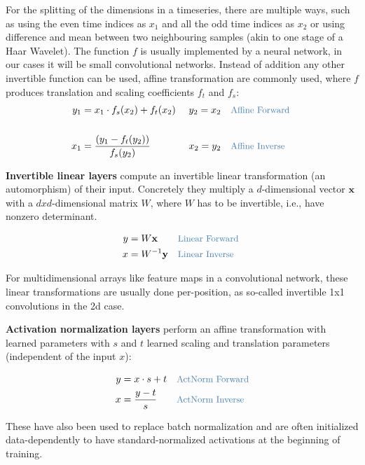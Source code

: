 % 

For the splitting of the dimensions in a timeseries, there are multiple
ways, such as using the even time indices as $x_1$ and all the odd
time indices as $x_2$ or using difference and mean between two
neighbouring samples (akin to one stage of a Haar Wavelet). The function
$f$ is usually implemented by a neural network, in our cases it will
be small convolutional networks. Instead of addition any other
invertible function can be used, affine transformation are commonly
used, where $f$ produces translation and scaling coefficients $f_t$
and $f_s$:
\begin{align*}
    y_1 &= x_1 \cdot f_s(x_2) + f_t(x_2) && \text{ } y_2=x_2 && \codecomment{\text{Affine Forward }} \\
    \\
    x_1 &= \frac{(y_1  - f_t(y_2))}{f_s(y_2)} && \text{ } x_2=y_2 && \codecomment{\text{Affine Inverse}} \\
\end{align*}

\textbf{Invertible linear layers} compute an invertible linear
transformation (an automorphism) of their input. Concretely they
multiply a $d$-dimensional vector $\mathbf{x}$ with a
$dxd$-dimensional matrix $W$, where $W$ has to be invertible,
i.e., have nonzero determinant.

\begin{align*}
    y&=W \mathbf{x} && \codecomment{\text{Linear Forward }} \\
    x&=W^{-1} \mathbf{y} && \codecomment{\text{Linear Inverse}} \\
\end{align*}

For multidimensional arrays like feature maps in a convolutional
network, these linear transformations are usually done per-position, as
so-called invertible 1x1 convolutions in the 2d case.


\textbf{Activation normalization layers} perform an affine
transformation with learned parameters with $s$ and $t$ learned
scaling and translation parameters (independent of the input $x$):

\begin{align*}
    y&=x \cdot{s} + t && \codecomment{\text{ActNorm Forward}} \\
    x&=\frac{y - t}{s} && \codecomment{\text{ActNorm Inverse}} \\
\end{align*}

These have also been used to replace batch normalization and are often
initialized data-dependently to have standard-normalized activations at
the beginning of training.


